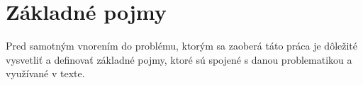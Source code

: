 \section{Základné pojmy}
Pred samotným vnorením do problému, ktorým sa zaoberá táto práca je dôležité vysvetliť a definovať základné pojmy, ktoré sú spojené s danou problematikou a využívané v texte.






